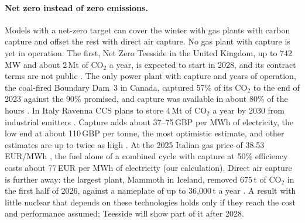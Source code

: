 \paragraph{Net zero instead of zero emissions.} Models with a net-zero target can cover the winter with gas plants with carbon capture and offset the rest with direct air capture. No gas plant with capture is yet in operation. The first, Net Zero Teesside in the United Kingdom, up to 742\,MW and about 2\,Mt of CO$_2$ a year, is expected to start in 2028, and its contract terms are not public \citep{NZT2026}. The only power plant with capture and years of operation, the coal-fired Boundary Dam~3 in Canada, captured 57\% of its CO$_2$ to the end of 2023 against the 90\% promised, and capture was available in about 80\% of the hours \citep{IEEFA2024}. In Italy Ravenna CCS plans to store 4\,Mt of CO$_2$ a year by 2030 from industrial emitters \citep{Eni2026}. Capture adds about 37--75\,GBP per MWh of electricity, the low end at about 110\,GBP per tonne, the most optimistic estimate, and other estimates are up to twice as high \citep{Goodall2025}. At the 2025 Italian gas price of 38.53\,EUR/MWh \citep{GME2025}, the fuel alone of a combined cycle with capture at 50\% efficiency costs about 77\,EUR per MWh of electricity (our calculation). Direct air capture is further away: the largest plant, Mammoth in Iceland, removed 675\,t of CO$_2$ in the first half of 2026, against a nameplate of up to 36{,}000\,t a year \citep{EnergyConnects2026}. A result with little nuclear that depends on these technologies holds only if they reach the cost and performance assumed; Teesside will show part of it after 2028.


